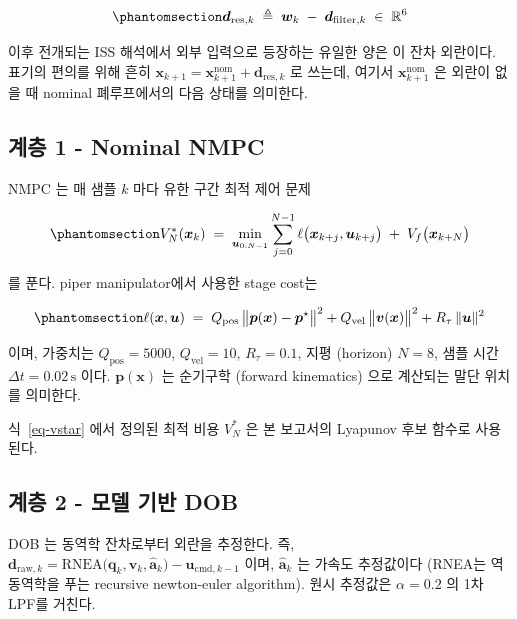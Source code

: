 \documentclass[
  11pt,
]{article}
\theoremstyle{plain}
\theoremstyle{plain}
\theoremstyle{definition}
\theoremstyle{remark}
\begin{document}
\begin{equation}\protect\phantomsection\label{eq-dres-def}{
\bm{d}_{\mathrm{res},k} \;\triangleq\;
\bm{w}_k \;-\; \bm{d}_{\mathrm{filter},k}
\;\in\;\mathbb{R}^6
}\end{equation}

이후 전개되는 ISS 해석에서 외부 입력으로 등장하는 유일한 양은 이 잔차
외란이다. 표기의 편의를 위해 흔히
\(\bm{x}_{k+1} = \bm{x}_{k+1}^{\mathrm{nom}} + \bm{d}_{\mathrm{res},k}\)
로 쓰는데, 여기서 \(\bm{x}_{k+1}^{\mathrm{nom}}\) 은 외란이 없을 때
nominal 폐루프에서의 다음 상태를 의미한다.

\subsection{계층 1 - Nominal NMPC}\label{sec-nmpc}

NMPC 는 매 샘플 \(k\) 마다 유한 구간 최적 제어 문제

\begin{equation}\protect\phantomsection\label{eq-vstar}{
V_N^*(\bm{x}_k)
\;=\;
\min_{\bm{u}_{0:N-1}}
\sum_{j=0}^{N-1} \ell\bigl(\bm{x}_{k+j},\bm{u}_{k+j}\bigr)
\;+\; V_f\bigl(\bm{x}_{k+N}\bigr)
}\end{equation}

를 푼다. piper manipulator에서 사용한 stage cost는

\begin{equation}\protect\phantomsection\label{eq-stage}{
\ell(\bm{x},\bm{u}) \;=\;
Q_{\mathrm{pos}}\,\bigl\|\bm{p}(\bm{x})-\bm{p}^{\star}\bigr\|^2
+ Q_{\mathrm{vel}}\,\bigl\|\bm{v}(\bm{x})\bigr\|^2
+ R_{\tau}\,\|\bm{u}\|^2
}\end{equation}

이며, 가중치는 \(Q_{\mathrm{pos}}=5000\), \(Q_{\mathrm{vel}}=10\),
\(R_{\tau}=0.1\), 지평 (horizon) \(N=8\), 샘플 시간
\(\Delta t = 0.02\,\text{s}\) 이다. \(\bm{p}(\bm{x})\) 는 순기구학
(forward kinematics) 으로 계산되는 말단 위치를 의미한다.

식~\ref{eq-vstar} 에서 정의된 최적 비용 \(V_N^*\) 은 본 보고서의
Lyapunov 후보 함수로 사용된다.

\subsection{계층 2 - 모델 기반 DOB}\label{sec-dob}

DOB 는 동역학 잔차로부터 외란을 추정한다. 즉,
\(\bm{d}_{\mathrm{raw},k} = \mathrm{RNEA}\bigl(\bm{q}_k,\bm{v}_k,
\hat{\bm{a}}_k\bigr) - \bm{u}_{\mathrm{cmd},k-1}\) 이며,
\(\hat{\bm{a}}_k\) 는 가속도 추정값이다 (RNEA는 역동역학을 푸는
recursive newton-euler algorithm). 원시 추정값은 \(\alpha = 0.2\) 의 1차
LPF를 거친다.
\end{document}
